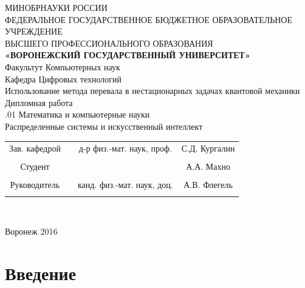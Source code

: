 \documentclass[14pt]{extarticle}
\newcommand{\sectionbreak}{\clearpage}
\begin{document}
\begin{center}
	\hfill \break
	\large{МИНОБРНАУКИ РОССИИ}\\
	\footnotesize{ФЕДЕРАЛЬНОЕ ГОСУДАРСТВЕННОЕ БЮДЖЕТНОЕ ОБРАЗОВАТЕЛЬНОЕ УЧРЕЖДЕНИЕ}\\
	\footnotesize{ВЫСШЕГО ПРОФЕССИОНАЛЬНОГО ОБРАЗОВАНИЯ}\\
	\small{\textbf{«ВОРОНЕЖСКИЙ ГОСУДАРСТВЕННЫЙ УНИВЕРСИТЕТ»}}\\
	\hfill \break
	\normalsize{Факультут Компьютерных наук}\\
	\hfill \break
	\normalsize{Кафедра Цифровых технологий}\\
	\hfill\break
	\hfill \break
	\hfill \break
	\hfill \break
	\large{Использование метода перевала в нестационарных задачах квантовой механики}\\
	\hfill \break
	\hfill \break
	\hfill \break
	\normalsize{Дипломная работа\\
		\hfill {}.01 Математика и компьютерные науки\\
		\hfill \break
		Распределенные системы и искусственный интеллект}\\
	\hfill \break
	\hfill \break
\end{center}

\hfill \break
\hfill \break

\normalsize{
	\begin{tabular}{cccc}
		Зав. кафедрой & \underline{\hspace{3cm}} &  д-р физ.-мат. наук,  проф. & С.Д. Кургалин \\\\
		Студент & \underline{\hspace{3cm}} & &А.А. Махно \\\\
		Руководитель & \underline{\hspace{3cm}}& канд. физ.-мат. наук, доц. &  А.В. Флегель \\\\
	\end{tabular}
}\\
\hfill \break
\hfill \break
\begin{center} Воронеж 2016 \end{center}
\thispagestyle{empty} %

\newpage	
\tableofcontents
\thispagestyle{empty} %
\sectionbreak
\section*{Введение}
\end{document}
